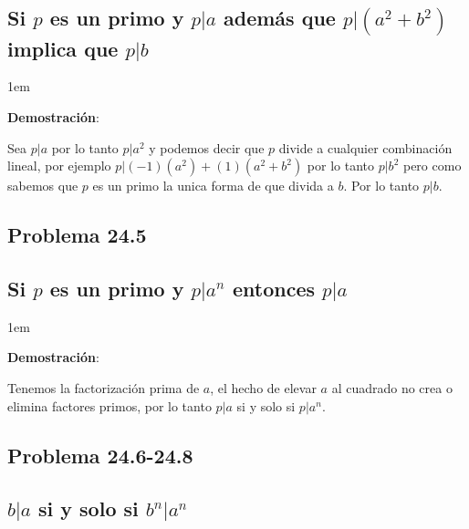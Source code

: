 \documentclass[12pt, fleqn]{article}                             %
\newenvironment{SmallIndentation}[1][0.75em]                    %
    {\begin{adjustwidth}{#1}{}\begin{footnotesize}}                 %
    {\end{footnotesize}\end{adjustwidth}}                           %
\begin{document}
    \subsection*{Si $p$ es un primo y $p|a$ además que $p|(a^2+b^2)$
        implica que $p|b$}

    \begin{SmallIndentation}[1em]
        \textbf{Demostración}:
        
        Sea $p|a$ por lo tanto $p|a^2$ y podemos decir que $p$ divide
        a cualquier combinación lineal, por ejemplo $p|(-1)(a^2)+(1)(a^2+b^2)$
        por lo tanto $p|b^2$ pero como sabemos que $p$ es un primo la unica
        forma de que divida a $b$. Por lo tanto $p|b$.

    \end{SmallIndentation}


    \subsection{Problema 24.5}
    \subsection*{Si $p$ es un primo y $p|a^n$ entonces $p|a$}

    \begin{SmallIndentation}[1em]
        \textbf{Demostración}:
        
        Tenemos la factorización prima de $a$, el hecho de elevar
        $a$ al cuadrado no crea o elimina factores primos, por lo tanto
        $p|a$ si y solo si $p|a^n$.

    \end{SmallIndentation}


    \clearpage
    \subsection{Problema 24.6-24.8}
    \subsection*{$b|a$ si y solo si $b^n|a^n$}
\end{document}
